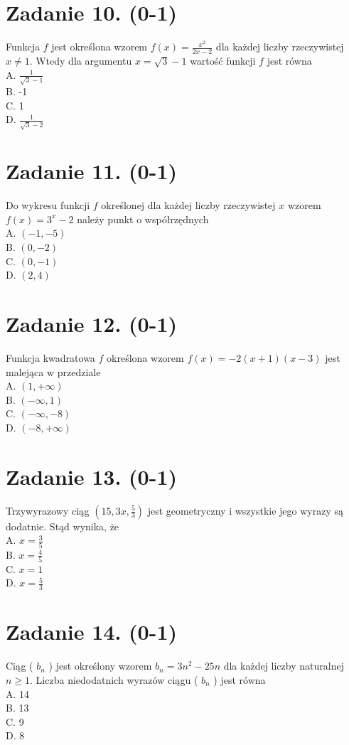 \documentclass[10pt]{article}
\begin{document}
\section*{Zadanie 10. (0-1)}
Funkcja \(f\) jest określona wzorem \(f(x)=\frac{x^{2}}{2 x-2}\) dla każdej liczby rzeczywistej \(x \neq 1\). Wtedy dla argumentu \(x=\sqrt{3}-1\) wartość funkcji \(f\) jest równa\\
A. \(\frac{1}{\sqrt{3}-1}\)\\
B. -1\\
C. 1\\
D. \(\frac{1}{\sqrt{3}-2}\)

\section*{Zadanie 11. (0-1)}
Do wykresu funkcji \(f\) określonej dla każdej liczby rzeczywistej \(x\) wzorem \(f(x)=3^{x}-2\) należy punkt o współrzędnych\\
A. \((-1,-5)\)\\
B. \((0,-2)\)\\
C. \((0,-1)\)\\
D. \((2,4)\)

\section*{Zadanie 12. (0-1)}
Funkcja kwadratowa \(f\) określona wzorem \(f(x)=-2(x+1)(x-3)\) jest malejąca w przedziale\\
A. \((1,+\infty)\)\\
B. \((-\infty, 1)\)\\
C. \((-\infty,-8)\)\\
D. \((-8,+\infty)\)

\section*{Zadanie 13. (0-1)}
Trzywyrazowy ciąg \(\left(15,3 x, \frac{5}{3}\right)\) jest geometryczny i wszystkie jego wyrazy są dodatnie. Stąd wynika, że\\
A. \(x=\frac{3}{5}\)\\
B. \(x=\frac{4}{5}\)\\
C. \(x=1\)\\
D. \(x=\frac{5}{3}\)

\section*{Zadanie 14. (0-1)}
Ciąg ( \(b_{n}\) ) jest określony wzorem \(b_{n}=3 n^{2}-25 n\) dla każdej liczby naturalnej \(n \geq 1\). Liczba niedodatnich wyrazów ciągu ( \(b_{n}\) ) jest równa\\
A. 14\\
B. 13\\
C. 9\\
D. 8
\end{document}
